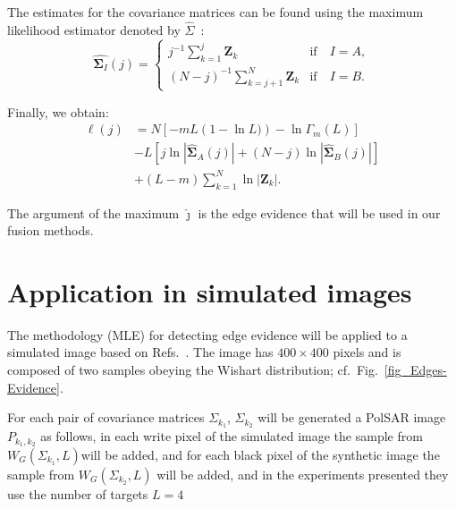 \documentclass[conference]{IEEEtran}
\begin{document}
The estimates for the covariance matrices can be found using the maximum likelihood estimator denoted by $\widehat{\Sigma}$~\cite{good}: 
\begin{equation}
\widehat{\mathbf\Sigma_{I}}(j) = \left\{
\begin{array}{lc}
	j^{-1}\sum_{k=1}^{j}\mathbf{Z}_{k}  & \mbox{if}\quad I=A,  \\
        (N-j)^{-1}\sum_{k=j+1}^{N}\mathbf{Z}_{k} & \mbox{if}\quad I=B.
\end{array}
\right.\label{eq_13}
\end{equation}

Finally, we obtain:
\begin{align}
	\ell(j)&=N\left[-mL(1-\ln{L)})-\ln{\Gamma_m(L)}\right] \nonumber\\
	&-L\left[j\ln{|\mathbf{\widehat{\Sigma}}_{A}(j)|} +(N-j)\ln{|\mathbf{\widehat{\Sigma}}_{B}(j)|}\right]\nonumber\\
	&+(L-m)\sum_{k=1}^{N}\ln{|\mathbf{Z}_{k}|}.
\label{eq_14}
\end{align}

The argument of the maximum $\widehat{\jmath}$ is the edge evidence that will be used in our fusion methods.

\section{Application in simulated images}\label{cap_acf_sec4}

The methodology (MLE) for detecting edge evidence will be applied to a simulated image based on Refs.~\cite{nhfc,gamf}. 
The image has $400\times400$ pixels and is composed of two samples obeying the Wishart distribution; cf.\ Fig.~\ref{fig_Edges-Evidence}.

For each pair of covariance matrices $\Sigma_{k_1}$, $\Sigma_{k_2}$ will be generated a PolSAR image $P_{k_1,k_2}$ as follows, in each write pixel of the simulated image the sample from  $W_G(\Sigma_{k_1}, L)$will be added,  and for each black pixel of the synthetic image the sample from $W_G(\Sigma_{k_2},L)$ will be added, and in the experiments presented they use the number of targets $L=4$
\end{document}
